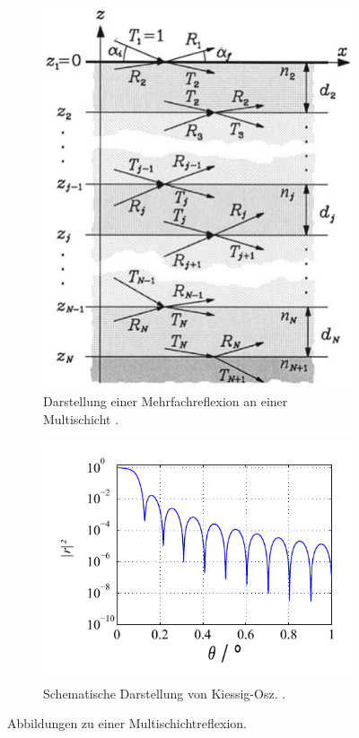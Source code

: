 \begin{figure}
    \begin{subfigure}{0.38\textwidth}
        \centering
        \includegraphics[width=\textwidth]{pictures/multischicht.pdf}
        \caption{Darstellung einer Mehrfachreflexion an einer Multischicht \cite{tolan_xray}.}
        \label{fig:multischicht}
    \end{subfigure}
    \begin{subfigure}{0.58\textwidth}
        \centering
        \includegraphics[width=\textwidth]{pictures/kiessig.pdf}
        \caption{Schematische Darstellung von Kiessig-Osz. . \cite{kiessig}}
        \label{fig:kiessig}
    \end{subfigure}
    \caption{Abbildungen zu einer Multischichtreflexion.
    \label{fig:subkiessig}}
\end{figure}


